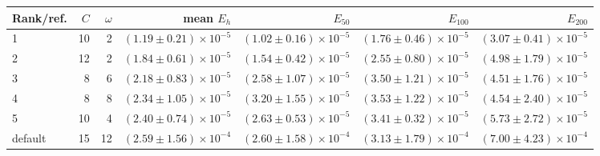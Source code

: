 \begin{tabular}{lrrrrrr}
\toprule
Rank/ref. & $C$ & $\omega$ & mean $E_h$ & $E_{50}$ & $E_{100}$ & $E_{200}$ \\
\midrule
1 & 10 & 2 & $(1.19 \pm 0.21) \times 10^{-5}$ & $(1.02 \pm 0.16) \times 10^{-5}$ & $(1.76 \pm 0.46) \times 10^{-5}$ & $(3.07 \pm 0.41) \times 10^{-5}$ \\
2 & 12 & 2 & $(1.84 \pm 0.61) \times 10^{-5}$ & $(1.54 \pm 0.42) \times 10^{-5}$ & $(2.55 \pm 0.80) \times 10^{-5}$ & $(4.98 \pm 1.79) \times 10^{-5}$ \\
3 & 8 & 6 & $(2.18 \pm 0.83) \times 10^{-5}$ & $(2.58 \pm 1.07) \times 10^{-5}$ & $(3.50 \pm 1.21) \times 10^{-5}$ & $(4.51 \pm 1.76) \times 10^{-5}$ \\
4 & 8 & 8 & $(2.34 \pm 1.05) \times 10^{-5}$ & $(3.20 \pm 1.55) \times 10^{-5}$ & $(3.53 \pm 1.22) \times 10^{-5}$ & $(4.54 \pm 2.40) \times 10^{-5}$ \\
5 & 10 & 4 & $(2.40 \pm 0.74) \times 10^{-5}$ & $(2.63 \pm 0.53) \times 10^{-5}$ & $(3.41 \pm 0.32) \times 10^{-5}$ & $(5.73 \pm 2.72) \times 10^{-5}$ \\
default & 15 & 12 & $(2.59 \pm 1.56) \times 10^{-4}$ & $(2.60 \pm 1.58) \times 10^{-4}$ & $(3.13 \pm 1.79) \times 10^{-4}$ & $(7.00 \pm 4.23) \times 10^{-4}$ \\
\bottomrule
\end{tabular}

